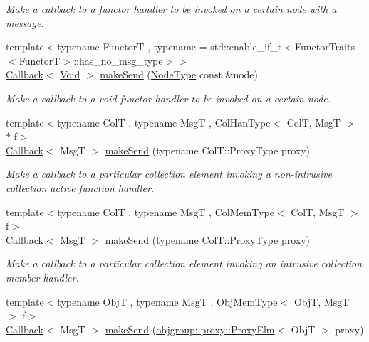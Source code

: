 \begin{DoxyCompactItemize}
\begin{DoxyCompactList}\small\item\em Make a callback to a functor handler to be invoked on a certain node with a message. \end{DoxyCompactList}\item 
{\footnotesize template$<$typename FunctorT , typename  = std\+::enable\+\_\+if\+\_\+t$<$\+Functor\+Traits$<$\+Functor\+T$>$\+::has\+\_\+no\+\_\+msg\+\_\+type$>$$>$ }\\\hyperlink{namespacevt_a36db99df4c973d48b1118a293fff533f}{Callback}$<$ \hyperlink{structvt_1_1pipe_1_1_pipe_manager_ab720c2580ecfd3ab36e49aeaaff64cc6}{Void} $>$ \hyperlink{structvt_1_1pipe_1_1_pipe_manager_a89f95b27b13c69f2fe84dc29fd604082}{make\+Send} (\hyperlink{namespacevt_a866da9d0efc19c0a1ce79e9e492f47e2}{Node\+Type} const \&node)
\begin{DoxyCompactList}\small\item\em Make a callback to a void functor handler to be invoked on a certain node. \end{DoxyCompactList}\item 
{\footnotesize template$<$typename ColT , typename MsgT , Col\+Han\+Type$<$ Col\+T, Msg\+T $>$ $\ast$ f$>$ }\\\hyperlink{namespacevt_a36db99df4c973d48b1118a293fff533f}{Callback}$<$ MsgT $>$ \hyperlink{structvt_1_1pipe_1_1_pipe_manager_a612b59953b949edc575577e313e3b187}{make\+Send} (typename Col\+T\+::\+Proxy\+Type proxy)
\begin{DoxyCompactList}\small\item\em Make a callback to a particular collection element invoking a non-\/intrusive collection active function handler. \end{DoxyCompactList}\item 
{\footnotesize template$<$typename ColT , typename MsgT , Col\+Mem\+Type$<$ Col\+T, Msg\+T $>$ f$>$ }\\\hyperlink{namespacevt_a36db99df4c973d48b1118a293fff533f}{Callback}$<$ MsgT $>$ \hyperlink{structvt_1_1pipe_1_1_pipe_manager_a87e25e6a0151c0a9a48b58e6f4679b02}{make\+Send} (typename Col\+T\+::\+Proxy\+Type proxy)
\begin{DoxyCompactList}\small\item\em Make a callback to a particular collection element invoking an intrusive collection member handler. \end{DoxyCompactList}\item 
{\footnotesize template$<$typename ObjT , typename MsgT , Obj\+Mem\+Type$<$ Obj\+T, Msg\+T $>$ f$>$ }\\\hyperlink{namespacevt_a36db99df4c973d48b1118a293fff533f}{Callback}$<$ MsgT $>$ \hyperlink{structvt_1_1pipe_1_1_pipe_manager_aa5d48a3b64820bec240a6a61bdfb4524}{make\+Send} (\hyperlink{structvt_1_1objgroup_1_1proxy_1_1_proxy_elm}{objgroup\+::proxy\+::\+Proxy\+Elm}$<$ ObjT $>$ proxy)

\end{DoxyCompactItemize}
